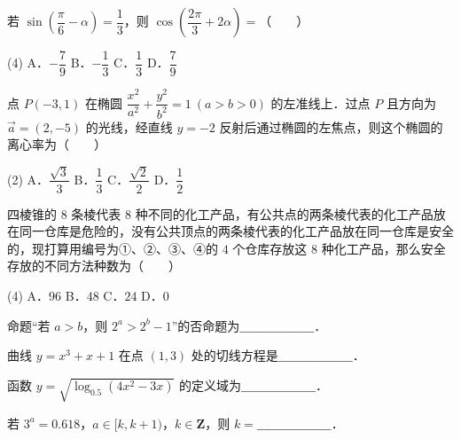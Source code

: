 \begin{question}
若 $\sin\left(\dfrac{\pi}{6} - \alpha\right) = \dfrac{1}{3}$，则 $\cos\left(\dfrac{2\pi}{3} + 2\alpha\right) =$\mbox{（　　）}

\begin{gkopts}(4)
\task A．$-\dfrac{7}{9}$
\task B．$-\dfrac{1}{3}$
\task C．$\dfrac{1}{3}$
\task D．$\dfrac{7}{9}$
\end{gkopts}

\end{question}
\begin{question}
点 $P(-3, 1)$ 在椭圆 $\dfrac{x^2}{a^2} + \dfrac{y^2}{b^2} = 1\ (a > b > 0)$ 的左准线上．过点 $P$ 且方向为 $\vec{a} = (2, -5)$ 的光线，经直线 $y = -2$ 反射后通过椭圆的左焦点，则这个椭圆的离心率为\mbox{（　　）}

\begin{gkopts}(2)
\task A．$\dfrac{\sqrt{3}}{3}$
\task B．$\dfrac{1}{3}$
\task C．$\dfrac{\sqrt{2}}{2}$
\task D．$\dfrac{1}{2}$
\end{gkopts}

\end{question}
\begin{question}
四棱锥的 $8$ 条棱代表 $8$ 种不同的化工产品，有公共点的两条棱代表的化工产品放在同一仓库是危险的，没有公共顶点的两条棱代表的化工产品放在同一仓库是安全的，现打算用编号为①、②、③、④的 $4$ 个仓库存放这 $8$ 种化工产品，那么安全存放的不同方法种数为\mbox{（　　）}

\begin{gkopts}(4)
\task A．$96$
\task B．$48$
\task C．$24$
\task D．$0$
\end{gkopts}

\end{question}
\begin{question}
命题“若 $a > b$，则 $2^a > 2^b - 1$”的否命题为＿＿＿＿＿＿．

\end{question}
\begin{question}
曲线 $y = x^3 + x + 1$ 在点 $(1, 3)$ 处的切线方程是＿＿＿＿＿＿．

\end{question}
\begin{question}
函数 $y = \sqrt{\log_{0.5}(4x^2 - 3x)}$ 的定义域为＿＿＿＿＿＿．

\end{question}
\begin{question}
若 $3^a = 0.618$，$a \in [k, k+1)$，$k \in \mathbf{Z}$，则 $k =$＿＿＿＿＿＿．

\end{question}
